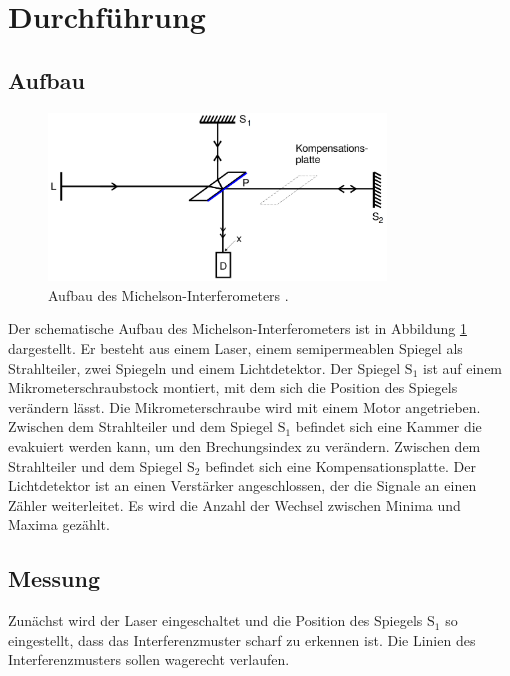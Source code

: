 \section{Durchführung}
\label{sec:Durchführung}

\subsection{Aufbau}

\begin{figure}
    \centering
    \includegraphics[width=0.8\textwidth]{img/aufbau.png}
    \caption{Aufbau des Michelson-Interferometers \cite{V401}.}
    \label{fig:Aufbau}
\end{figure}

Der schematische Aufbau des Michelson-Interferometers ist in Abbildung \ref{fig:Aufbau} dargestellt.
Er besteht aus einem Laser, einem semipermeablen Spiegel als Strahlteiler, zwei Spiegeln und einem Lichtdetektor.
Der Spiegel $\text{S}_1$ ist auf einem Mikrometerschraubstock montiert, mit dem sich die Position des Spiegels verändern lässt.
Die Mikrometerschraube wird mit einem Motor angetrieben. Zwischen dem Strahlteiler und dem Spiegel $\text{S}_1$ befindet sich
eine Kammer die evakuiert werden kann, um den Brechungsindex zu verändern. 
Zwischen dem Strahlteiler und dem Spiegel $\text{S}_2$ befindet sich eine Kompensationsplatte.
Der Lichtdetektor ist an einen Verstärker angeschlossen, der die Signale an einen Zähler weiterleitet.
Es wird die Anzahl der Wechsel zwischen Minima und Maxima gezählt.

\subsection{Messung}

Zunächst wird der Laser eingeschaltet und die Position des Spiegels $\text{S}_1$ so eingestellt, dass das Interferenzmuster
scharf zu erkennen ist. Die Linien des Interferenzmusters sollen wagerecht verlaufen.

